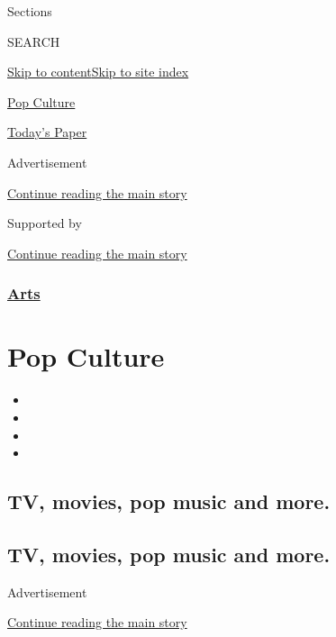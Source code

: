 Sections

SEARCH

\protect\hyperlink{site-content}{Skip to
content}\protect\hyperlink{site-index}{Skip to site index}

\href{https://www.nytimes3xbfgragh.onion/spotlight/pop-culture}{Pop
Culture}

\href{https://myaccount.nytimes3xbfgragh.onion/auth/login?response_type=cookie\&client_id=vi}{}

\href{https://www.nytimes3xbfgragh.onion/section/todayspaper}{Today's
Paper}

Advertisement

\protect\hyperlink{after-top}{Continue reading the main story}

Supported by

\protect\hyperlink{after-sponsor}{Continue reading the main story}

\hypertarget{arts}{%
\subsubsection{\texorpdfstring{\href{/section/arts}{Arts}}{Arts}}\label{arts}}

\hypertarget{pop-culture}{%
\section{Pop Culture}\label{pop-culture}}

\begin{itemize}
\item
\item
\item
\item
\end{itemize}

\hypertarget{tv-movies-pop-music-and-more}{%
\subsection{TV, movies, pop music and
more.}\label{tv-movies-pop-music-and-more}}

\hypertarget{tv-movies-pop-music-and-more-1}{%
\subsection{TV, movies, pop music and
more.}\label{tv-movies-pop-music-and-more-1}}

Advertisement

\protect\hyperlink{after-subheader}{Continue reading the main story}

